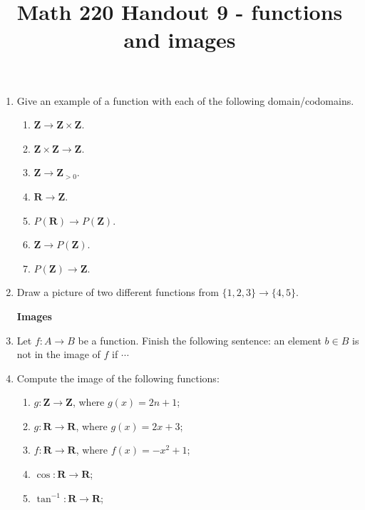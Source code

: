 \documentclass[12pt, reqno]{amsart}
\begin{document}
\title[Math 220 Handout 9 - functions and images]{Math 220 Handout 9  - functions and images}\maketitle

\begin{enumerate}
\item Give an example of a function with each of the following
  domain/codomains.
  \begin{enumerate}
  \item $\mathbf{Z} \to \mathbf{Z} \times \mathbf{Z}$.
  \item $\mathbf{Z} \times \mathbf{Z} \to \mathbf{Z}$.
  \item $\mathbf{Z} \to \mathbf{Z}_{>0}$.
  \item $\mathbf{R} \to \mathbf{Z}$.
  \item $P(\mathbf{R}) \to P(\mathbf{Z})$.
  \item $\mathbf{Z} \to P(\mathbf{Z})$.
  \item $P(\mathbf{Z}) \to \mathbf{Z}$.
  \end{enumerate}
  \vspace{11cm}


\item Draw a picture of two different functions from $\{1,2,3\} \to \{4,5\}$.


\newpage 

\begin{center}
  \textbf{Images}
\end{center}




\item Let $f\colon A \to B$ be a function. Finish the following
  sentence: an element $b \in B$ is not in the image of $f$ if
  $\cdots$\\\vspace{2cm}


\item Compute the image of the following functions:
  \begin{enumerate}

  \item $g \colon \mathbf{Z} \to \mathbf{Z}$, where $g(x) = 2n + 1$;
  \item $g \colon \mathbf{R} \to \mathbf{R}$, where $g(x) = 2x + 3$;
  \item $f \colon \mathbf{R} \to \mathbf{R}$, where $f(x) = -x^2 + 1$;
  \item $\cos \colon \mathbf{R} \to \mathbf{R}$;
  \item $\tan^{-1} \colon \mathbf{R} \to \mathbf{R}$;
  \end{enumerate}
\vspace{1in}


\end{enumerate}
\end{document}
